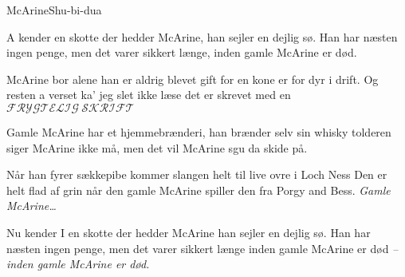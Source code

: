 \begin{sang}{McArine}{Shu-bi-dua}
\begin{vers}
A kender en skotte der hedder McArine,
han sejler en dejlig sø.
Han har næsten ingen penge,
men det varer sikkert længe,
inden gamle McArine er død.
\end{vers}
\begin{vers}
McArine bor alene han er aldrig blevet gift
for en kone er for dyr i drift.
Og resten a verset
ka' jeg slet ikke læse
det er skrevet med en $\mathscr{FRYGTELIG\ SKRIFT}$
\end{vers}
\begin{omkvaed}
 Gamle McArine har et hjemmebrænderi,
 han brænder selv sin whisky
 tolderen siger McArine ikke må,
 men det vil McArine sgu da skide på.
\end{omkvaed}
\begin{vers}
Når han fyrer sækkepibe kommer slangen helt til live
ovre i Loch Ness
Den er helt flad af grin
når den gamle McArine
spiller den fra Porgy and Bess.
\emph{Gamle McArine\dots}
\end{vers}

\begin{vers}
Nu kender I en skotte der hedder McArine
han sejler en dejlig sø.
Han har næsten ingen penge,
men det varer sikkert længe
inden gamle McArine er død
\emph{-- inden gamle McArine er død.}
\end{vers}
\end{sang}
